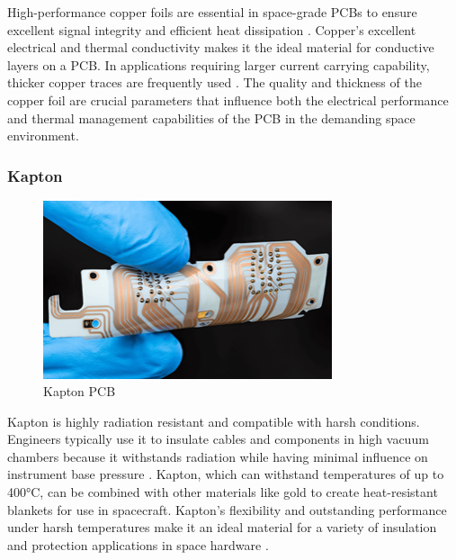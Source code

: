 High-performance copper foils are essential in space-grade PCBs to ensure excellent signal integrity and efficient heat dissipation \cite{RefWorks:2025applying}. 
Copper's excellent electrical and thermal conductivity makes it the ideal material for conductive layers on a PCB. 
In applications requiring larger current carrying capability, thicker copper traces are frequently used \cite{RefWorks:2022design}. 
The quality and thickness of the copper foil are crucial parameters that influence both the electrical performance and thermal management capabilities of the PCB in the demanding space environment.

\subsubsection{Kapton}

\begin{figure}[htbp]
    \centering
    \includegraphics[width=8.5cm]{chapters/methodology/MaterialAnalysis/Fig5Kapton.png}
    \caption{Kapton PCB \cite{RefWorks:goodfellow2025kapton}}
    \label{fig:kapton-pcb}
\end{figure}

Kapton is highly radiation resistant and compatible with harsh conditions. 
Engineers typically use it to insulate cables and components in high vacuum chambers because it withstands radiation while having minimal influence on instrument base pressure \cite{RefWorks:2024making}. 
Kapton, which can withstand temperatures of up to 400°C, can be combined with other materials like gold to create heat-resistant blankets for use in spacecraft. 
Kapton's flexibility and outstanding performance under harsh temperatures make it an ideal material for a variety of insulation and protection applications in space hardware \cite{RefWorks:2024making}.


